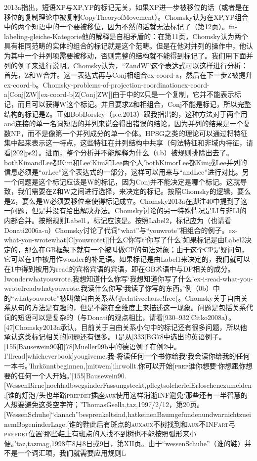 2013a指出，短语XP与XP,YP的标记无关，如果XP进一步被移位的话（或者是在移位的复制理论中被复制CopyTheoryofMovement）。Chomsky认为在XP,YP组合中的两个短语中的一个要被移位，因为不然的话就无法标记了（第12页）。fn-labeling-gleiche-Kategorie他的解释是自相矛盾的：在第11页，Chomsky认为两个具有相同范畴的实体的组合的标记就是这个范畴。但是在他对并列的操作中，他认为其中一个并列项需要被移动，否则完整的结构就不能得到标记了。我们用下面并列的例子来进行说明。Chomsky认为，“ZandW”这个表达式可以这样进行分析：首先，Z和W合并。这一表达式再与Conj相组合ex-coord-a，然后在下一步Z被提升ex-coord-b。Chomsky-problems-of-projection-coordinationex-coord-a[Conj[ZW]]ex-coord-b[Z[Conj[ZW]]由于中的Z只是一个复制，它并不能表示标记，而且可以获得W这个标记。并且要求Z和相组合，Conj不能是标记，所以完整结构的标记是Z。正如BobBorsley（p.c.2013）跟我指出的，这种方法对于两个用and连接的单一名词短语的并列来说会得出错误的结论，因为并列的结果是一个复数NP，而不是像第一个并列成分的单一个体。HPSG之类的理论可以通过将特征集中起来表示这一特点，这些特征在并列结构中共享（句法特征和非域内特征，请看[202]ps2）。进而，整个分析并不能解释为什么（i.b）被规则排除出去了。bothKimandLee都Kim和Lee`Kim和Lee两个人'bothKimorLee都Kim或Lee并列的信息必须是“orLee”这个表达式的一部分，这样可以用来与“andLee”进行对比。另一个问题是这个标记应该是W的标记，因为Conj并不能决定是哪个标记。这就导致，我们需要在Z和W之间进行选择，来决定的标记。按照Chomsky的逻辑，要么是Z，要么是W必须要移位来使得标记成立。Chomsky2013a在脚注40中提到了这一问题，但是并没有给出解决办法。Chomsky讨论的另一特殊情况是LI与非LI的内部合并。按照规则Label1，标记应该是。按照Label2，标记应为（也请看Donati2006a-u）Chomsky讨论了代词“what”与“youwrote”相组合的例子。ex-what-you-wrotewhat[C[youwrotet]]什么C你写t`你写了什么'如果标记是由Label2决定的，那么在GB框架下就有一个被叫做CP的句法对象；由于这个CP是疑问句，它可以在1中被用作wonder的补足语。如果标记是由Label1来决定的，我们就可以在1中得到被用为read的宾格宾语的宾语，即在GB术语中与DP相关的成分。Iwonderwhatyouwrote.我想知道什么你写`我想知道你写了什么'ex-i-read-what-you-wroteIreadwhatyouwrote.我读什么你写`我读了你写的东西。'例（0b）中的“whatyouwrote”被叫做自由关系从句relativeclause!free(。Chomsky关于自由关系从句的方法是有趣的，但是不能在全维度上来描述这一现象。问题是包括关系代词的短语可以是复杂的（与Donati的观点相比，请看[930--932]Citko2008a）。[47]Chomsky2013a承认，目前关于自由关系小句中的标记还有很多问题，所以他承认这类标记相关的问题还有很多。1是从[333]BG78中选出的英语例子。[155]Bausewein90和[78]Mueller99b中的德语例子在例2中。I'llread[whicheverbook]yougiveme.我-将读任何一个书你给我`我会读你给我的任何一本书。'Ihrkönntbeginnen,[mitwem]ihrwollt.你可以开始[\textsc{prep}谁你想要`你想跟你想要的任何一个人开始。'[155]Bausewein90.[WessenBirne]nochhalbwegsinderFassungsteckt,pflegtsolcherleiErloschenezumeiden;[谁的灯泡/头也半路\textsc{prep}\textsc{det}插座\textsc{aux}使用这样消逝INF避免`那些还有一半智慧的人想要避免这类空字符；'ThomasGsella,taz,1997/2/12，第20页。[WessenSchuhe]"`danach"'besprenkeltsind,hatkeinenBaumgefundenundwarnichtzueinemBogeninderLage.[谁的鞋此后有斑点的\textsc{aux}\textsc{aux}不树找到和\textsc{aux}不INF\textsc{art}弓\textsc{prep}\textsc{det}位置`那些鞋上有斑点的人找不到树也不能按照弧形来小便。'taz,tazmag,1998年8月8日或9日，第XII页。由于“wessenSchuhe”（谁的鞋）并不是一个词汇项，我们就需要应用规则L